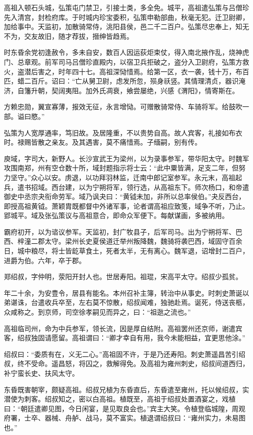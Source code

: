 \documentclass[12pt,UTF8]{ctexbook}
\begin{document}
高祖入顿石头城，弘策屯门禁卫，引接士类，多全免。城平，高祖遣弘策与吕僧珍先入清宫，封检府库。于时城内珍宝委积，弘策申勒部曲，秋毫无犯。迁卫尉卿，加给事中。天监初，加散骑常侍，洮阳县侯，邑二千二百户。弘策尽忠奉上，知无不为，交友故旧，随才荐拔，搢绅皆趋焉。

时东昏余党初逢赦令，多未自安，数百人因运荻炬束仗，得入南北掖作乱，烧神虎门、总章观。前军司马吕僧珍直殿内，以宿卫兵拒破之，盗分入卫尉府，弘策方救火，盗潜后害之，时年四十七。高祖深恸惜焉。给第一区，衣一袭，钱十万，布百匹，蜡二百斤。诏曰：“亡从舅卫尉，虑发所忽，殒身祅竖。其情理清贞，器识淹济，自籓升朝，契阔夷阻。加外氏凋衰，飨尝屡绝，兴感《渭阳》，情寄斯在。

方赖忠勋，翼宣寡薄，报效无征，永言增恸。可赠散骑常侍、车骑将军。给鼓吹一部。谥曰愍。”

弘策为人宽厚通率，笃旧故。及居隆重，不以贵势自高。故人宾客，礼接如布衣时。禄赐皆散之亲友。及其遇害，莫不痛惜焉。子缅嗣，别有传。

庾域，字司大，新野人。长沙宣武王为梁州，以为录事参军，带华阳太守。时魏军攻围南郑，州有空仓数十所，域封题指示将士云：“此中粟皆满，足支二年，但努力坚守。”众心以安。虏退，以功拜羽林监，迁南中郎记室参军。永元末，高祖起兵，遣书招域。西台建，以为宁朔将军，领行选，从高祖东下。师次杨口，和帝遣御史中丞宗夬衔命劳军。域乃讽夬曰：“黄钺未加，非所以总率侯伯。”夬反西台，即授高祖黄钺。萧颖胄既都督中外诸军事，论者谓高祖应致笺，域争不听，乃止。郢城平。域及张弘策议与高祖意合，即命众军便下。每献谋画，多被纳用。

霸府初开，以为谘议参军。天监初，封广牧县子，后军司马。出为宁朔将军、巴西、梓潼二郡太守。梁州长史夏侯道迁举州叛降魏，魏骑将袭巴西，域固守百余日，城中粮尽，将士皆龁草食土，死者太半，无有离心。魏军退，诏增封二百户，进爵为伯。六年，卒于郡。

郑绍叔，字仲明，荥阳开封人也。世居寿阳。祖琨，宋高平太守。绍叔少孤贫。

年二十余，为安豊令，居县有能名。本州召补主簿，转治中从事史。时刺史萧诞以弟谌诛，台遣收兵卒至，左右莫不惊散，绍叔闻难，独驰赴焉。诞死，侍送丧柩，众咸称之。到京师，司空徐孝嗣见而异之，曰：“祖逖之流也。”

高祖临司州，命为中兵参军，领长流，因是厚自结附。高祖罢州还京师，谢遣宾客，绍叔独固请愿留。高祖谓曰：“卿才幸自有用，我今未能相益，宜更思他涂。”

绍叔曰：“委质有在，义无二心。”高祖固不许，于是乃还寿阳。刺史萧遥昌苦引绍叔，终不受命。遥昌怒，将囚之，救解得免。及高祖为雍州刺史，绍叔间道西归，补宁蛮长史、扶风太守。

东昏既害朝宰，颇疑高祖。绍叔兄植为东昏直后，东昏遣至雍州，托以候绍叔，实潜使为刺客。绍叔知之，密以白高祖。植既至，高祖于绍叔处置酒宴之，戏植曰：“朝廷遣卿见图，今日闲宴，是见取良会也。”宾主大笑。令植登临城隍，周观府署，士卒、器械、舟舻、战马，莫不富实。植退谓绍叔曰：“雍州实力，未易图也。”
\end{document}
